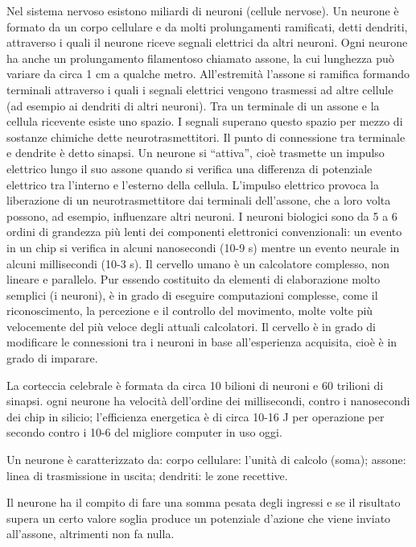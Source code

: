 \documentclass[12pt,a4paper,oneside]{book}
\begin{document}
		
		
	Nel sistema nervoso esistono miliardi di neuroni (cellule nervose). Un neurone è formato da un corpo cellulare e da molti prolungamenti ramificati, detti dendriti, attraverso i quali il neurone riceve segnali elettrici da altri neuroni. Ogni neurone ha anche un prolungamento filamentoso chiamato assone, la cui lunghezza può variare da circa 1 cm a qualche metro. All’estremità l’assone si ramifica formando terminali attraverso i quali i segnali elettrici vengono trasmessi ad altre cellule (ad esempio ai dendriti di altri neuroni). Tra un terminale di un assone e la cellula ricevente esiste uno spazio. I segnali superano questo spazio per mezzo di sostanze chimiche dette neurotrasmettitori. Il punto di connessione tra terminale e dendrite è detto sinapsi. Un neurone si “attiva”, cioè trasmette un impulso elettrico lungo il suo assone quando si verifica una differenza di potenziale elettrico tra l’interno e l’esterno della cellula. L’impulso elettrico provoca la liberazione di un neurotrasmettitore dai terminali dell’assone, che a loro volta possono, ad esempio, influenzare altri neuroni. I neuroni biologici sono da 5 a 6 ordini di grandezza più lenti dei componenti elettronici convenzionali: un evento in un chip si verifica in alcuni nanosecondi (10-9 s) mentre un evento neurale in alcuni millisecondi (10-3 s). Il cervello umano è un calcolatore complesso, non lineare e parallelo. Pur essendo costituito da elementi di elaborazione molto semplici (i neuroni), è in grado di eseguire computazioni complesse, come il riconoscimento, la percezione e il controllo del movimento, molte volte più velocemente del più veloce degli attuali calcolatori. Il cervello è in grado di modificare le connessioni tra i neuroni in base all’esperienza acquisita, cioè è in grado di imparare. 
		
		
	 
		La corteccia celebrale è formata da circa 10 bilioni di neuroni e 60 trilioni di sinapsi. 
		ogni neurone ha velocità dell'ordine dei millisecondi, contro i nanosecondi dei chip in silicio; 
		l'efficienza energetica è di circa 10-16 J per operazione per secondo contro i 10-6 del migliore
		computer in uso oggi. 
		
		Un neurone è caratterizzato da:
		corpo cellulare: l'unità di calcolo (soma); 
		assone: linea di trasmissione in uscita; 
		dendriti: le zone recettive. 
		
		Il neurone ha il compito di fare una somma pesata degli ingressi e se il risultato supera un certo valore soglia produce un potenziale d'azione che viene inviato all'assone, altrimenti non fa nulla. 
		
\end{document}
